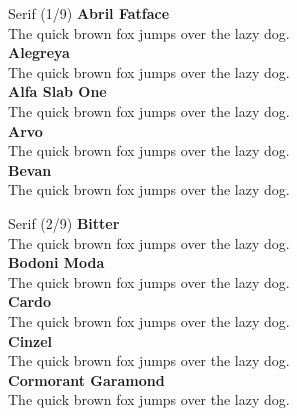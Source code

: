 \documentclass[10pt]{beamer}
\begin{document}
\begin{frame}{Serif (1/9)}
\vspace{-0.2cm}
  {\AbrilFatfaceLocal\Large\bfseries Abril Fatface\\}
  {\AbrilFatfaceLocal The quick brown fox jumps over the lazy dog.\\[0.3cm]}
  {\AlegreyaLocal\Large\bfseries Alegreya\\}
  {\AlegreyaLocal The quick brown fox jumps over the lazy dog.\\[0.3cm]}
  {\AlfaSlabOneLocal\Large\bfseries Alfa Slab One\\}
  {\AlfaSlabOneLocal The quick brown fox jumps over the lazy dog.\\[0.3cm]}
  {\ArvoLocal\Large\bfseries Arvo\\}
  {\ArvoLocal The quick brown fox jumps over the lazy dog.\\[0.3cm]}
  {\BevanLocal\Large\bfseries Bevan\\}
  {\BevanLocal The quick brown fox jumps over the lazy dog.\\[0.3cm]}
\end{frame}

\begin{frame}{Serif (2/9)}
\vspace{-0.2cm}
  {\BitterLocal\Large\bfseries Bitter\\}
  {\BitterLocal The quick brown fox jumps over the lazy dog.\\[0.3cm]}
  {\BodoniModaLocal\Large\bfseries Bodoni Moda\\}
  {\BodoniModaLocal The quick brown fox jumps over the lazy dog.\\[0.3cm]}
  {\CardoLocal\Large\bfseries Cardo\\}
  {\CardoLocal The quick brown fox jumps over the lazy dog.\\[0.3cm]}
  {\CinzelLocal\Large\bfseries Cinzel\\}
  {\CinzelLocal The quick brown fox jumps over the lazy dog.\\[0.3cm]}
  {\CormorantGaramondLocal\Large\bfseries Cormorant Garamond\\}
  {\CormorantGaramondLocal The quick brown fox jumps over the lazy dog.\\[0.3cm]}
\end{frame}
\end{document}
